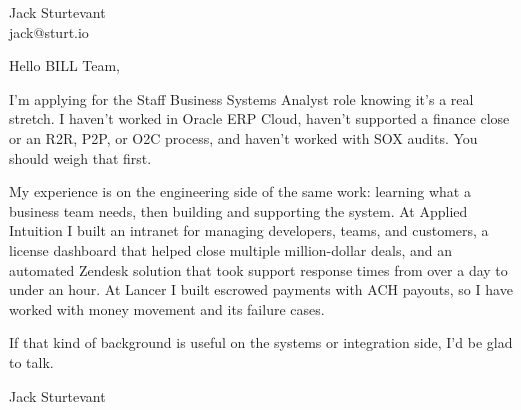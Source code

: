 \documentclass[11pt]{article}
\begin{document}
\raggedright

{\namefont\fontsize{20pt}{24pt}\selectfont Jack Sturtevant}\\[-0.3em]
jack@sturt.io

\vspace{1.2em}

Hello BILL Team,

I'm applying for the Staff Business Systems Analyst role knowing it's a real stretch. I haven't worked in Oracle ERP Cloud, haven't supported a finance close or an R2R, P2P, or O2C process, and haven't worked with SOX audits. You should weigh that first.

My experience is on the engineering side of the same work: learning what a business team needs, then building and supporting the system. At Applied Intuition I built an intranet for managing developers, teams, and customers, a license dashboard that helped close multiple million-dollar deals, and an automated Zendesk solution that took support response times from over a day to under an hour. At Lancer I built escrowed payments with ACH payouts, so I have worked with money movement and its failure cases.

If that kind of background is useful on the systems or integration side, I'd be glad to talk.

\vspace{0.6em}
Jack Sturtevant
\end{document}
